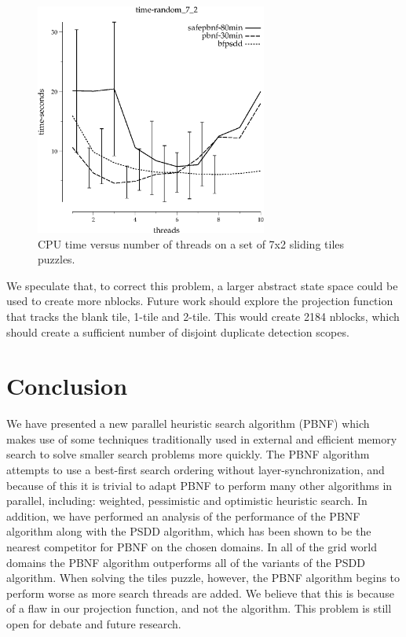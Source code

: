 \documentclass{article}
\begin{document}
\begin{figure}[t]
\begin{center}
\includegraphics[width=3in]{../graphs/tiles_random_7_2/time-random_7_2.eps}
\caption{CPU time versus number of threads on a set of 7x2 sliding
  tiles puzzles.}
\label{fig:tiles-7x2}
\end{center}
\end{figure}

We speculate that, to correct this problem, a larger abstract state
space could be used to create more nblocks.  Future work should
explore the projection function that tracks the blank tile, 1-tile and
2-tile.  This would create 2184 nblocks, which should create a
sufficient number of disjoint duplicate detection scopes.

\section{Conclusion}

We have presented a new parallel heuristic search algorithm (PBNF)
which makes use of some techniques traditionally used in external and
efficient memory search to solve smaller search problems more quickly.
The PBNF algorithm attempts to use a best-first search ordering
without layer-synchronization, and because of this it is trivial to
adapt PBNF to perform many other algorithms in parallel, including:
weighted, pessimistic and optimistic heuristic search.  In addition,
we have performed an analysis of the performance of the PBNF algorithm
along with the PSDD algorithm, which has been shown to be the nearest
competitor for PBNF on the chosen domains.  In all of the grid world
domains the PBNF algorithm outperforms all of the variants of the PSDD
algorithm.  When solving the tiles puzzle, however, the PBNF algorithm
begins to perform worse as more search threads are added.  We believe
that this is because of a flaw in our projection function, and not the
algorithm.  This problem is still open for debate and future research.
\end{document}
